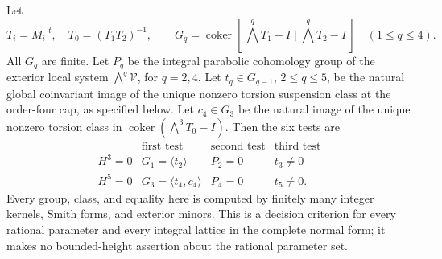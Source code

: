 \begin{theorem}
Let
\[
 T_i=M_i^{-t},\quad T_0=(T_1T_2)^{-1},\qquad
 G_q=\operatorname{coker}
 [\,\bigwedge^qT_1-I\mid\bigwedge^qT_2-I\,]
 \quad(1\le q\le4).
 \tag{F.HC2}\label{maps:eq:F.HC2}
\]
All $G_q$ are finite.  Let $P_q$ be the integral parabolic
cohomology group of the exterior local system
$\bigwedge^q\mathcal V$, for $q=2,4$.
Let $t_q\in G_{q-1}$, $2\le q\le5$, be the natural global
coinvariant image of the unique nonzero torsion suspension
class at the order-four cap, as specified below.
Let $c_4\in G_3$ be the natural image of the unique nonzero
torsion class in
$\operatorname{coker}(\bigwedge^3T_0-I)$.
Then the six tests are
\[
\begin{array}{c|ccc}
 &\text{first test}&\text{second test}&\text{third test}\\ \hline
 H^3=0&G_1=\langle t_2\rangle&P_2=0&t_3\ne0\\
 H^5=0&G_3=\langle t_4,c_4\rangle&P_4=0&t_5\ne0 .
\end{array}
\tag{F.HC3}\label{maps:eq:F.HC3}
\]
Every group, class, and equality here is computed by
finitely many integer kernels, Smith forms, and exterior
minors.  This is a decision criterion for every rational
parameter and every integral lattice in the complete
normal form; it makes no bounded-height assertion about
the rational parameter set.

\end{theorem}



